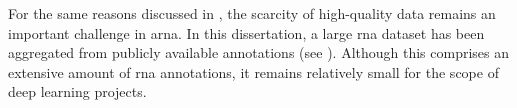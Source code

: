 

For the same reasons discussed in
, the scarcity of high-quality
data remains an important challenge in \gls{arna}. In this
dissertation, a large \gls{rna} dataset has been aggregated
from publicly available annotations (see
). Although this comprises
an extensive amount of \gls{rna} annotations, it remains
relatively small for the scope of deep learning projects.
